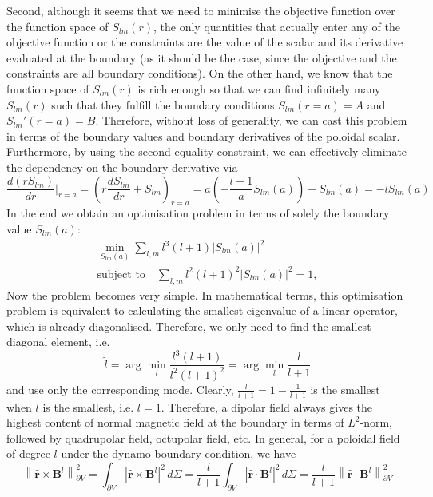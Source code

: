 \documentclass[a4paper, 11pt]{article}
\begin{document}
Second, although it seems that we need to minimise the objective function over the function space of $S_{lm}(r)$, the only quantities that actually enter any of the objective function or the constraints are the value of the scalar and its derivative evaluated at the boundary (as it should be the case, since the objective and the constraints are all boundary conditions). On the other hand, we know that the function space of $S_{lm}(r)$ is rich enough so that we can find infinitely many $S_{lm}(r)$ such that they fulfill the boundary conditions $S_{lm}(r=a) = A$ and $S_{lm}'(r=a) = B$. Therefore, without loss of generality, we can cast this problem in terms of the boundary values and boundary derivatives of the poloidal scalar. Furthermore, by using the second equality constraint, we can effectively eliminate the dependency on the boundary derivative via
\[
    \frac{d(rS_{lm})}{dr}\bigg|_{r=a} = \left(r\frac{d S_{lm}}{dr} + S_{lm}\right)_{r=a} = a \left(-\frac{l+1}{a}S_{lm}(a)\right) + S_{lm}(a) = -l S_{lm}(a)
\]
In the end we obtain an optimisation problem in terms of solely the boundary value $S_{lm}(a)$:
\begin{equation}
    \begin{gathered}
        \min_{S_{lm}(a)} \sum_{l,m} l^3 (l+1) |S_{lm}(a)|^2 \\ 
        \text{subject to} \quad \sum_{l,m} l^2(l+1)^2 |S_{lm}(a)|^2 = 1,
    \end{gathered}
\end{equation}
Now the problem becomes very simple. In mathematical terms, this optimisation problem is equivalent to calculating the smallest eigenvalue of a linear operator, which is already diagonalised. Therefore, we only need to find the smallest diagonal element, i.e.
\[
    \hat{l} = \arg \min_{l} \frac{l^3(l+1)}{l^2(l+1)^2} = \arg \min_{l} \frac{l}{l+1}
\]
and use only the corresponding mode. Clearly, $\frac{l}{l+1} = 1 - \frac{1}{l+1}$ is the smallest when $l$ is the smallest, i.e. $l=1$. Therefore, a dipolar field always gives the highest content of normal magnetic field at the boundary in terms of $L^2$-norm, followed by quadrupolar field, octupolar field, etc. 
In general, for a poloidal field of degree $l$ under the dynamo boundary condition, we have
\begin{equation}
    \left\|\hat{\mathbf{r}}\times \mathbf{B}^l\right\|^2_{\partial V} = \int_{\partial V} \left|\hat{\mathbf{r}}\times \mathbf{B}^l\right|^2 \, d\Sigma = \frac{l}{l+1} \int_{\partial V} \left|\hat{\mathbf{r}}\cdot \mathbf{B}^l\right|^2 \, d\Sigma = \frac{l}{l+1} \left\|\hat{\mathbf{r}}\cdot \mathbf{B}^l\right\|^2_{\partial V}
\end{equation}
\end{document}
